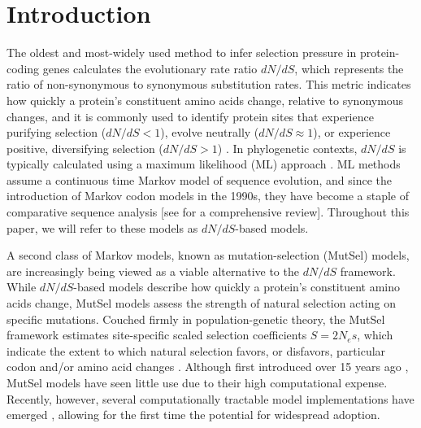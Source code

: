 \documentclass[11pt]{article}
\begin{document}
\section*{Introduction}
		
The oldest and most-widely used method to infer selection pressure in protein-coding genes calculates the evolutionary rate ratio $dN/dS$, which represents the ratio of non-synonymous to synonymous substitution rates. This metric indicates how quickly a protein's constituent amino acids change, relative to synonymous changes, and it is commonly used to identify protein sites that experience purifying selection ($dN/dS<1$), evolve neutrally ($dN/dS\approx1$), or experience positive, diversifying selection ($dN/dS>1$) \citep{NielsenYang1998, Yangetal2000, KosakovskyPondFrost2005b, Huelsenbecketal2006}. In phylogenetic contexts, $dN/dS$ is typically calculated using a maximum likelihood (ML) approach \citep{GoldmanYang1994,MuseGaut1994,NielsenYang1998,Yang2006}. ML methods assume a continuous time Markov model of sequence evolution, and since the introduction of Markov codon models in the 1990s, they have become a staple of comparative sequence analysis [see \citet{Anisimova2009} for a comprehensive review]. Throughout this paper, we will refer to these models as $dN/dS$-based models. 




A second class of Markov models, known as mutation-selection (MutSel) models, are increasingly being viewed as a viable alternative to the $dN/dS$ framework. While $dN/dS$-based models describe how quickly a protein's constituent amino acids change, MutSel models assess the strength of natural selection acting on specific mutations. Couched firmly in population-genetic theory, the MutSel framework estimates site-specific scaled selection coefficients $S=2N_es$, which indicate the extent to which natural selection favors, or disfavors, particular codon and/or amino acid changes \citep{HalpernBruno1998,YangNielsen2008,Rodrigueetal2010,Tamurietal2012}. Although first introduced over 15 years ago \citep{HalpernBruno1998}, MutSel models have seen little use due to their high computational expense. Recently, however, several computationally tractable model implementations have emerged \citep{RodrigueLartillot2014,Tamurietal2014}, allowing for the first time the potential for widespread adoption.		
		
\end{document}
